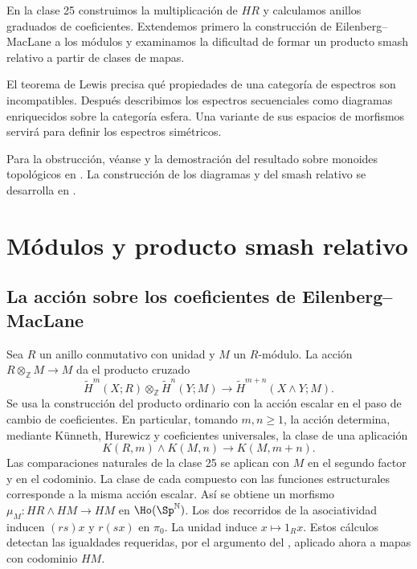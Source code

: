 
En la clase 25 construimos la multiplicación de $HR$ y calculamos anillos graduados de coeficientes. Extendemos primero la construcción de Eilenberg--MacLane a los módulos y examinamos la dificultad de formar un producto smash relativo a partir de clases de mapas.

El teorema de Lewis precisa qué propiedades de una categoría de espectros son incompatibles. Después describimos los espectros secuenciales como diagramas enriquecidos sobre la categoría esfera. Una variante de sus espacios de morfismos servirá para definir los espectros simétricos.

Para la obstrucción, véanse \cite[§§~1--2, teorema~1.1 y lema~2.4]{lewis1991} y la demostración del resultado sobre monoides topológicos en \cite[proposiciones~3.2 y~3.6]{may1972gils}. La construcción de los diagramas y del smash relativo se desarrolla en \cite[§§~1--2, ejemplos~4.1--4.4 y §~22, ecuación~(22.2)]{mandell_may_schwede_shipley2001}.

\section{Módulos y producto smash relativo}

\subsection{La acción sobre los coeficientes de Eilenberg--MacLane}

Sea $R$ un anillo conmutativo con unidad y $M$ un $R$-módulo. La acción $R\otimes_{\mathbb Z}M\to M$ da el producto cruzado
\[
\widetilde H^m(X;R)\otimes_{\mathbb Z}\widetilde H^n(Y;M)
\longrightarrow \widetilde H^{m+n}(X\wedge Y;M).
\]
Se usa la construcción del producto ordinario con la acción escalar en el paso de cambio de coeficientes. En particular, tomando $m,n\geq1$, la acción determina, mediante Künneth, Hurewicz y coeficientes universales, la clase de una aplicación
\[
K(R,m)\wedge K(M,n)\longrightarrow K(M,m+n).
\]
Las comparaciones naturales de la clase 25 se aplican con $M$ en el segundo factor y en el codominio. La clase de cada compuesto con las funciones estructurales corresponde a la misma acción escalar. Así se obtiene un morfismo $\mu_M\colon HR\wedge HM\to HM$ en $\Ho(\Sp^{\mathbb N})$. Los dos recorridos de la asociatividad inducen $(rs)x$ y $r(sx)$ en $\pi_0$. La unidad induce $x\mapsto1_Rx$. Estos cálculos detectan las igualdades requeridas, por el argumento del , aplicado ahora a mapas con codominio $HM$.

